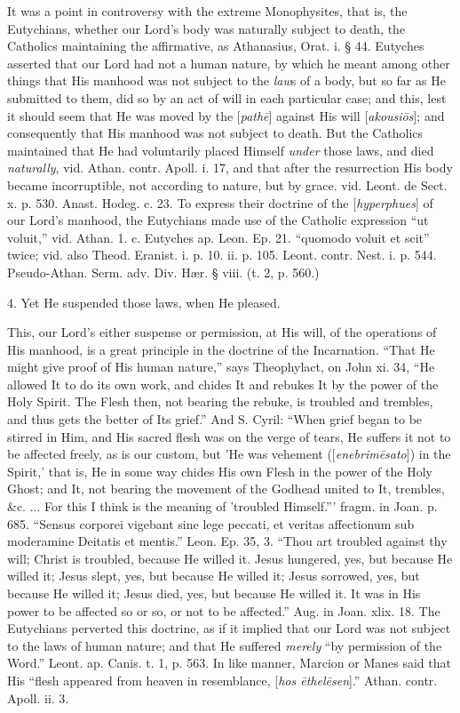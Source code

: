 It was a point in controversy with the extreme
Monophysites, that is, the Eutychians, whether our Lord's body was
naturally subject to death, the Catholics maintaining the affirmative,
as Athanasius, Orat. i. § 44. Eutyches asserted that our Lord had not
a human nature, by which he meant among other things that His manhood
was not subject to the \emph{law}s of a body, but so far as He
submitted to them, did so by an act of will in each particular case;
and this, lest it should seem that He was moved by the [\emph{path\={e}}]
against His will [\emph{akousi\={o}s}]; and consequently that His
manhood was not subject to death. But the Catholics maintained that He
had voluntarily placed Himself \emph{under} those laws, and died \emph{naturally},
vid. Athan. contr. Apoll. i. 17, and that after the resurrection His
body became incorruptible, not according to nature, but by grace. vid.
Leont. de Sect. x. p. 530. Anast. Hodeg. c. 23. To express their
doctrine of the [\emph{hyperphues}] of our Lord's manhood, the
Eutychians made use of the Catholic expression ``ut voluit,'' vid. Athan.
1. c. Eutyches ap. Leon. Ep. 21. ``quomodo voluit et scit'' twice; vid.
also Theod. Eranist. i. p. 10. ii. p. 105. Leont. contr. Nest. i. p.
544. Pseudo-Athan. Serm. adv. Div. Hær. § viii. (t. 2, p. 560.)

4. Yet He suspended those laws, when He pleased.

This, our Lord's either suspense or permission,
at His will, of the operations of His manhood, is a great principle in
the doctrine of the Incarnation. ``That He might give proof of His
human nature,'' says Theophylact, on John xi. 34, ``He allowed It to do
its own work, and chides It and rebukes It by the power of the
Holy Spirit. The Flesh then, not bearing the rebuke, is troubled and
trembles, and thus gets the better of Its grief.'' And S. Cyril: ``When
grief began to be stirred in Him, and His sacred flesh was on the
verge of tears, He suffers it not to be affected freely, as is our
custom, but 'He was vehement ([\emph{enebrim\={e}sato}]) in the
Spirit,' that is, He in some way chides His own Flesh in the power of
the Holy Ghost; and It, not bearing the movement of the Godhead united
to It, trembles, \&c. ... For this I think is the meaning of
'troubled Himself.''' fragm. in Joan. p. 685. ``Sensus corporei vigebant
sine lege peccati, et veritas affectionum sub moderamine Deitatis et
mentis.'' Leon. Ep. 35, 3. ``Thou art troubled against thy will; Christ
is troubled, because He willed it. Jesus hungered, yes, but because He
willed it; Jesus slept, yes, but because He willed it; Jesus sorrowed,
yes, but because He willed it; Jesus died, yes, but because He willed
it. It was in His power to be affected so or so, or not to be
affected.'' Aug. in Joan. xlix. 18. The Eutychians perverted this
doctrine, as if it implied that our Lord was not subject to the laws
of human nature; and that He suffered \emph{merely} ``by permission of
the Word.'' Leont. ap. Canis. t. 1, p. 563. In like manner, Marcion or
Manes said that His ``flesh appeared from heaven in resemblance, [\emph{hos
\={e}thel\={e}sen}].'' Athan. contr. Apoll. ii. 3.

